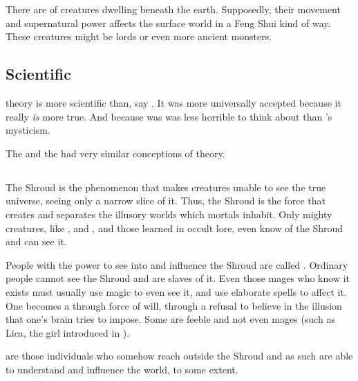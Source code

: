 There are  of creatures dwelling beneath the earth. Supposedly, their movement and supernatural power affects the surface world in a Feng Shui kind of way. These creatures might be \trueophidian{} lords or even more ancient monsters. 









\subsection{Scientific}
\Matrix theory is more scientific than, say . 
It was more universally accepted because it really \emph{is} more true. 
And because was was less horrible to think about than \Sethicus's \xs mysticism. 

The \dragons and the \resphain had very similar conceptions of \matrix theory. 









\subsection{\Vertex}
\index{\matrix}
The Shroud is the phenomenon that makes creatures unable to see the true universe, seeing only a narrow slice of it. Thus, the Shroud is the force that creates and separates the illusory worlds which mortals inhabit. Only mighty creatures, like \dragons, \banes{} and \resphain, and those learned in occult lore, even know of the Shroud and can see it.

\index{\vertex}
People with the power to see into and influence the Shroud are called \vertices. 
Ordinary people cannot see the Shroud and are slaves of it. 
Even those mages who know it exists must usually use magic to even see it, and use elaborate spells to affect it. 
One becomes a \vertex{} through force of will, through a refusal to believe in the illusion that one's brain tries to impose. 
Some \vertices{} are feeble and not even mages (such as Lica, the  girl introduced in \emph{\LicaBook}). 

\Vertices{} are those individuals who somehow reach outside the Shroud and as such are able to understand and influence the world, to some extent. 

